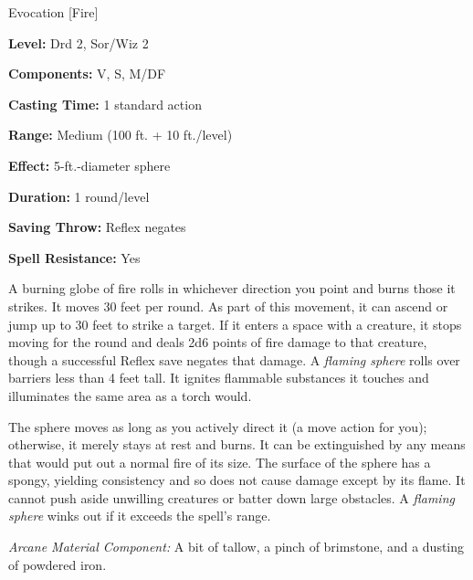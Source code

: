 
Evocation [Fire]

\textbf{Level:} Drd 2, Sor/Wiz 2

\textbf{Components:} V, S, M/DF

\textbf{Casting Time:} 1 standard action

\textbf{Range:} Medium (100 ft. + 10 ft./level)

\textbf{Effect:} 5-ft.-diameter sphere

\textbf{Duration:} 1 round/level

\textbf{Saving Throw:} Reflex negates

\textbf{Spell Resistance:} Yes

A burning globe of fire rolls in whichever direction you point and burns those 
it strikes. It moves 30 feet per round. As part of this movement, it can ascend 
or jump up to 30 feet to strike a target. If it enters a space with a creature, 
it stops moving for the round and deals 2d6 points of fire damage to that creature, 
though a successful Reflex save negates that damage. A \textit{flaming sphere} rolls 
over barriers less than 4 feet tall. It ignites flammable substances it touches 
and illuminates the same area as a torch would.

The sphere moves as long as you actively direct it (a move action for you); otherwise, 
it merely stays at rest and burns. It can be extinguished by any means that would 
put out a normal fire of its size. The surface of the sphere has a spongy, yielding 
consistency and so does not cause damage except by its flame. It cannot push aside 
unwilling creatures or batter down large obstacles. A \textit{flaming sphere} winks 
out if it exceeds the spell's range.

\textit{Arcane Material Component:} A bit of tallow, a pinch of brimstone, and 
a dusting of powdered iron.

